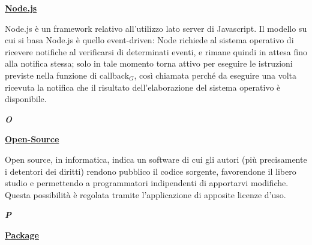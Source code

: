 \bigskip

\begin{addmargin}[0em]{0em}	
	\textbf{\underline{Node.js}} 
\end{addmargin}

\medskip
\begin{addmargin}[5em]{1em}	
Node.js è un framework relativo all'utilizzo lato server di Javascript. Il modello su cui si basa Node.js è quello event-driven: Node richiede al sistema operativo di ricevere notifiche al verificarsi di determinati eventi, e rimane quindi in attesa fino alla notifica stessa; solo in tale momento torna attivo per eseguire le istruzioni previste nella funzione di callback$_G$, così chiamata perché da eseguire una volta ricevuta la notifica che il risultato dell'elaborazione del sistema operativo è disponibile. 
\end{addmargin}	

	
\newpage

\cleardoublepage
{}
{}
\noindent\hrulefill\hspace{4mm}\textbf{\textsl{\Huge{O}}}\hspace{4mm}\hrulefill

\vspace*{2\bigskipamount}

\begin{addmargin}[0em]{0em}	
	\textbf{\underline{Open-Source}} 
\end{addmargin}
	
\medskip
\begin{addmargin}[5em]{1em}	
Open source, in informatica, indica un software di cui gli autori (più precisamente i detentori dei diritti) rendono pubblico il codice sorgente, favorendone il libero studio e permettendo a programmatori indipendenti di apportarvi modifiche. Questa possibilità è regolata tramite l'applicazione di apposite licenze d'uso.	
\end{addmargin}	
	
\newpage

\cleardoublepage
{}
{}
\noindent\hrulefill\hspace{4mm}\textbf{\textsl{\Huge{P}}}\hspace{4mm}\hrulefill

\vspace*{2\bigskipamount}

\begin{addmargin}[0em]{0em}	
	\textbf{\underline{Package}} 
\end{addmargin}

